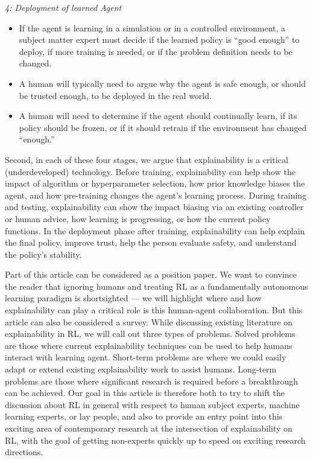 \documentclass[twoside,11pt]{article}
\begin{document}
\emph{4: Deployment of learned Agent}
    \begin{itemize}
        \item If the agent is learning in a simulation or in a controlled environment, a subject matter expert must decide if the learned policy is ``good enough'' to deploy, if more training is needed, or if the problem definition needs to be changed.
        \item A human will typically need to argue why the agent is safe enough, or should be trusted enough, to be deployed in the real world.
        \item A human will need to determine if the agent should continually learn, if its policy should be frozen, or if it should retrain if the environment has changed ``enough.'' 
    \end{itemize}

Second, in each of these four stages, we argue that explainability is a critical (underdeveloped) technology. Before training, explainability can help show the impact of algorithm or hyperparameter selection, how prior knowledge biases the agent, and how pre-training changes the agent's learning process. During training and testing, explainability can show the impact biasing via an existing controller or human advice, how learning is progressing, or how the current policy functions. In the deployment phase after training, explainability can help explain the final policy, improve trust, help the person evaluate safety, and understand the policy's stability.

Part of this article can be considered as a position paper. We want to convince the reader that ignoring humans and treating RL as a fundamentally autonomous learning paradigm is shortsighted --- we will highlight where and how explainability can play a critical role is this human-agent collaboration. But this article can also be considered a survey. While discussing existing literature on explainability in RL, we will call out three types of problems. Solved problems are those where current explainability techniques can be used to help humans interact with learning agent. Short-term problems are where we could easily adapt or extend existing explainability work to assist humans. Long-term problems are those where significant research is required before a breakthrough can be achieved. Our goal in this article is therefore both to try to shift the discussion about RL in general with respect to human subject experts, machine learning experts, or lay people, and also to provide an entry point into this exciting area of contemporary research at the intersection of explainability on RL, with the goal of getting non-experts quickly up to speed on exciting research directions.
\end{document}
